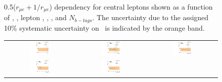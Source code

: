 \begin{figure}[htbp]
\begin{center}
\begin{tabular}{ccc}
    \end{tabular}
  \end{center}
  \caption{
    \label{fig:RDependencyCentral}
    0.5($r_{\mu e}+1/r_{\mu e}$) dependency for central leptons shown as a function of \nj, \nvtx, lepton \pt, \mll, \MET, and $N_{b-tags}$.
    The uncertainty due to the assigned 10\% systematic uncertainty on \rmue~is indicated by the orange band.
  }
\end{figure}

\begin{figure}[htbp]
  \begin{center}
    \begin{tabular}{ccc}
      \includegraphics[width=0.30\textwidth]{bkgd/figs/rSFOFFromRMuE_ZPeakControlForward_Run2015_25ns_NJets_None.pdf} &
      \includegraphics[width=0.30\textwidth]{bkgd/figs/rSFOFFromRMuE_ZPeakControlForward_Run2015_25ns_nVtx_None.pdf}  &
      \includegraphics[width=0.30\textwidth]{bkgd/figs/rSFOFFromRMuE_ZPeakControlForward_Run2015_25ns_TrailingPt_None.pdf} \\
      \includegraphics[width=0.30\textwidth]{bkgd/figs/rSFOFFromRMuE_ZPeakControlForward_Run2015_25ns_Mll_None.pdf} &
      \includegraphics[width=0.30\textwidth]{bkgd/figs/rSFOFFromRMuE_ZPeakControlForward_Run2015_25ns_MET_None.pdf} &

\end{tabular}
\end{center}
\end{figure}
